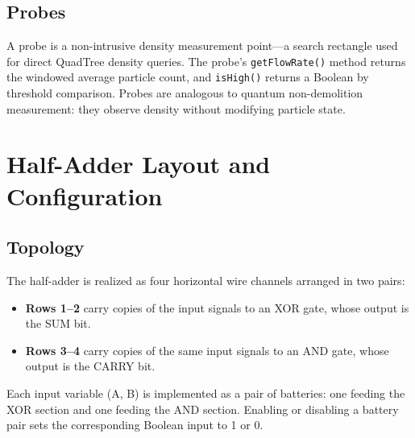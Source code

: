 \documentclass[11pt,a4paper]{article}
\begin{document}
\subsection{Probes}

A probe is a non-intrusive density measurement point---a search rectangle used for direct QuadTree density queries. The probe's \texttt{getFlowRate()} method returns the windowed average particle count, and \texttt{isHigh()} returns a Boolean by threshold comparison. Probes are analogous to quantum non-demolition measurement: they observe density without modifying particle state.


\section{Half-Adder Layout and Configuration}
\label{sec:layout}

\subsection{Topology}

The half-adder is realized as four horizontal wire channels arranged in two pairs:

\begin{itemize}
    \item \textbf{Rows 1--2} carry copies of the input signals to an XOR gate, whose output is the SUM bit.
    \item \textbf{Rows 3--4} carry copies of the same input signals to an AND gate, whose output is the CARRY bit.
\end{itemize}

Each input variable (A, B) is implemented as a pair of batteries: one feeding the XOR section and one feeding the AND section. Enabling or disabling a battery pair sets the corresponding Boolean input to 1 or 0.
\end{document}
